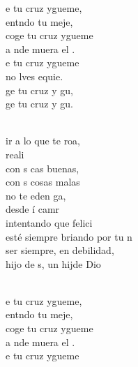 \documentclass[12pt]{article}
\begin{document}
\begin{multicols*}{2}
\begin{cancion}%
	\begin{chorus}%
	e tu cruz ygueme,  \\
	entndo tu meje, \\
	coge tu cruz ygueme  \\
	a nde muera el . \\
	e tu cruz ygueme  \\
	no lves equie. \\
	ge tu cruz y gu, \\
	ge tu cruz y gu. \\
	\end{chorus}%
	\jump\\
	ir a lo que te roa, \\
	 reali \\
	con s cas buenas, \\
	con s cosas malas \\
	no te eden ga, \\
	desde í camr \\
	intentando que  felici \\
	esté siempre briando por tu n  \\
	 ser siempre, en debilidad, \\
	 hijo de s, un hijde Dio\\\jump\\
	\begin{chorus}%
	e tu cruz ygueme,  \\
	entndo tu meje, \\
	coge tu cruz ygueme  \\
	a nde muera el . \\
	e tu cruz ygueme  \\

\end{chorus}
\end{cancion}
\end{multicols*}
\end{document}
